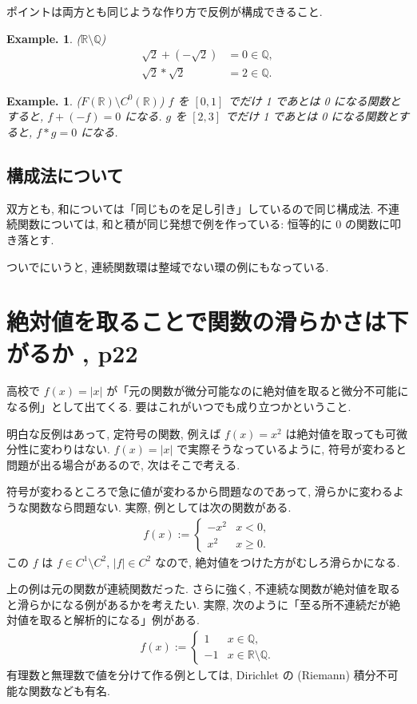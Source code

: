 \documentclass[openany, a4paper, oneside]{jsbook}
\theoremstyle{break}
\theoremstyle{breakdefn}
\newtheorem{ex}[thm]{Example.}
\newcommand{\rbk}[1]{\left (#1\right)}
\begin{document}
ポイントは両方とも同じような作り方で反例が構成できること.
\begin{ex}\textup{($\mathbb{R} \setminus \mathbb{Q}$)}
 \begin{align}
  \sqrt{2} + \rbk{- \sqrt{2}} &= 0 \in \mathbb{Q}, \\
  \sqrt{2} * \sqrt{2} &= 2 \in \mathbb{Q}.
 \end{align}
\end{ex}
\begin{ex}\textup{($F (\mathbb{R}) \setminus C^0 (\mathbb{R})$)}
$f$ を $[0,1]$ でだけ 1 であとは 0 になる関数とすると, $f + (-f) = 0$ になる.
$g$ を $[2,3]$ でだけ 1 であとは 0 になる関数とすると, $f * g = 0$ になる.
\end{ex}
\subsection{構成法について}


双方とも, 和については「同じものを足し引き」しているので同じ構成法.
不連続関数については, 和と積が同じ発想で例を作っている: 恒等的に 0 の関数に叩き落とす.

ついでにいうと, 連続関数環は整域でない環の例にもなっている.
\section{絶対値を取ることで関数の滑らかさは下がるか \cite{GelbaumOlmsted1}, p22}


高校で $f (x) = |x|$ が「元の関数が微分可能なのに絶対値を取ると微分不可能になる例」として出てくる.
要はこれがいつでも成り立つかということ.

明白な反例はあって, 定符号の関数, 例えば $f (x) = x^2$ は絶対値を取っても可微分性に変わりはない.
$f (x) = |x|$ で実際そうなっているように, 符号が変わると問題が出る場合があるので, 次はそこで考える.

符号が変わるところで急に値が変わるから問題なのであって, 滑らかに変わるような関数なら問題ない.
実際, 例としては次の関数がある.
\begin{align}
 f (x)
 :=
 \begin{cases}
  -x^2 & x < 0, \\
  x^2   & x \geq 0.
 \end{cases}
\end{align}
この $f$ は $f \in C^1 \setminus C^2$, $|f| \in C^2$ なので, 絶対値をつけた方がむしろ滑らかになる.

上の例は元の関数が連続関数だった.
さらに強く, 不連続な関数が絶対値を取ると滑らかになる例があるかを考えたい.
実際, 次のように「至る所不連続だが絶対値を取ると解析的になる」例がある.
\begin{align}
 f (x)
 :=
 \begin{cases}
  1  & x \in \mathbb{Q}, \\
  -1 & x \in \mathbb{R} \setminus \mathbb{Q}.
 \end{cases}
\end{align}
有理数と無理数で値を分けて作る例としては, Dirichlet の (Riemann) 積分不可能な関数なども有名.
\end{document}
